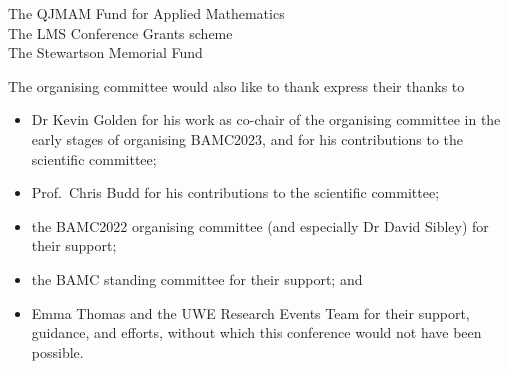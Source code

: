 \documentclass[12pt,a4paper]{article}
\begin{document}
{\centering
{\large The QJMAM Fund for Applied Mathematics} \\[18pt]
{\large The LMS Conference Grants scheme} \\[18pt] 
{\large The Stewartson Memorial Fund}

}

\vspace{18pt}
The organising committee would also like to thank express their thanks to
\begin{itemize}
    \item  Dr Kevin Golden for his work as co-chair of the organising committee in the early stages of organising BAMC2023, and for his contributions to the scientific committee; 
    \item Prof.\ Chris Budd for his contributions to the scientific committee;
    \item the BAMC2022 organising committee (and especially Dr David Sibley) for their support;
    \item the BAMC standing committee for their support; and
    \item Emma Thomas and the UWE Research Events Team for their support, guidance, and efforts, without which this conference would not have been possible.
\end{itemize}





\end{document}
